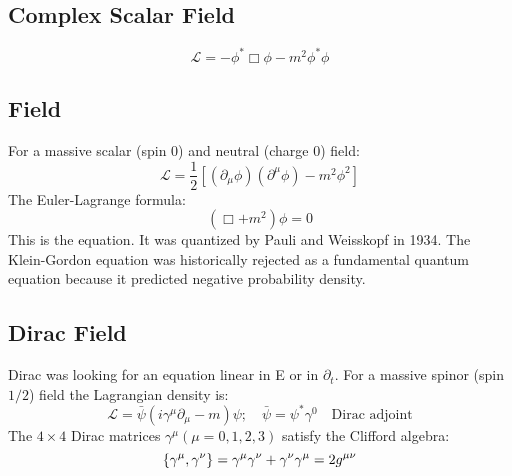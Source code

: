 \subsection{Complex Scalar Field}
\[  \mathcal{L}=-\phi^*\Box\phi-m^2\phi^*\phi\]

\subsection{\KG{} Field}
For a massive scalar (spin 0) and neutral (charge 0) field:
$$\mathcal{L} = \frac{1}{2} [(\partial_{\mu}\phi)(\partial^{\mu}\phi) -
m^{2} \phi^{2}]$$
The Euler-Lagrange formula:
$$ (\Box + m^{2})\phi = 0$$
This is the \KG{} equation. It was quantized by Pauli and Weisskopf in 1934.
The Klein-Gordon equation was historically rejected as a fundamental quantum
equation because it predicted negative probability density.

\subsection{Dirac Field}
Dirac was looking for an equation linear in E or in $\partial_t$. For a
massive spinor (spin $1/2$) field the Lagrangian density is:
$$ \mathcal{L} = \bar{\psi}(i\gamma^{\mu}\partial_{\mu} - m)\psi; \quad
\bar{\psi} = \psi^{*}\gamma^{0} \quad \text{Dirac adjoint} $$
The $4 \times 4$ Dirac matrices $\gamma^{\mu} (\mu = 0,1,2,3)$ satisfy the
Clifford algebra:
\[ 
    \{\gamma^{\mu},\gamma^{\nu}\}=\gamma^{\mu}\gamma^{\nu}+\gamma^{\nu}\gamma^{\mu}=2g^{\mu\nu} 
\]

